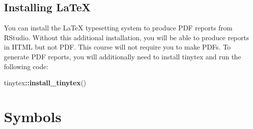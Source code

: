 \documentclass[
  oneside]{book}
\newenvironment{Shaded}{\begin{snugshade}}{\end{snugshade}}
\newcommand{\FunctionTok}[1]{\textcolor[rgb]{0.13,0.29,0.53}{\textbf{#1}}}
\newcommand{\NormalTok}[1]{#1}
\newcommand{\SpecialCharTok}[1]{\textcolor[rgb]{0.81,0.36,0.00}{\textbf{#1}}}
\begin{document}
\hypertarget{installing-latex}{%
\section{Installing LaTeX}\label{installing-latex}}

You can install the LaTeX typesetting system to produce PDF reports from RStudio. Without this additional installation, you will be able to produce reports in HTML but not PDF. This course will not require you to make PDFs. To generate PDF reports, you will additionally need to install tinytex \citep{R-tinytex} and run the following code:

\begin{Shaded}
\begin{Highlighting}[]
\NormalTok{tinytex}\SpecialCharTok{::}\FunctionTok{install\_tinytex}\NormalTok{()}
\end{Highlighting}
\end{Shaded}

\hypertarget{symbols}{%
\chapter{Symbols}\label{symbols}}
\end{document}
